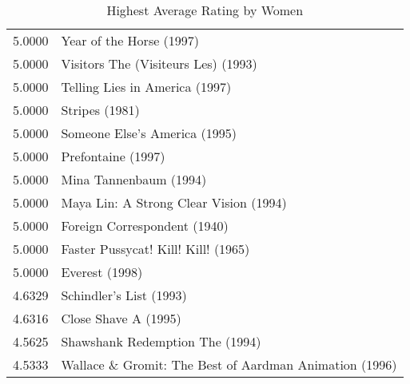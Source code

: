 \begin{flushleft}

\begin{table}[h]
\setlength{\tabcolsep}{12pt}
\centering
\begin{tabular}{|ll|}
\hline
5.0000 & Year of the Horse (1997)                                \\
5.0000 & Visitors The (Visiteurs Les) (1993)                     \\
5.0000 & Telling Lies in America (1997)                          \\
5.0000 & Stripes (1981)                                          \\
5.0000 & Someone Else's America (1995)                           \\
5.0000 & Prefontaine (1997)                                      \\
5.0000 & Mina Tannenbaum (1994)                                  \\
5.0000 & Maya Lin: A Strong Clear Vision (1994)                  \\
5.0000 & Foreign Correspondent (1940)                            \\
5.0000 & Faster Pussycat! Kill! Kill! (1965)                     \\
5.0000 & Everest (1998)                                          \\ \hline
4.6329 & Schindler's List (1993)                                 \\ \hline
4.6316 & Close Shave A (1995)                                    \\ \hline 
4.5625 & Shawshank Redemption The (1994)                         \\ \hline
4.5333 & Wallace \& Gromit: The Best of Aardman Animation (1996) \\ \hline
   
\end{tabular}
\caption{Highest Average Rating by Women}
\end{table}


\end{flushleft}




